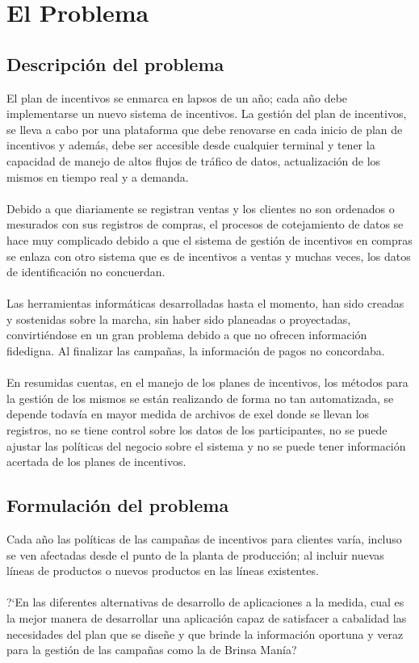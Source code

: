 \chapter{El Problema}\label{Problema}
\section{Descripci\'on del problema}
El plan de incentivos se enmarca en lapsos de un a\~no; cada a\~no debe implementarse un nuevo sistema de incentivos. La gesti\'on del plan de incentivos, se lleva a cabo por una plataforma que debe renovarse en cada inicio de plan de incentivos y adem\'as, debe ser accesible desde cualquier terminal y tener la capacidad de manejo de altos flujos de tr\'afico de datos, actualizaci\'on de los mismos en tiempo real y a demanda.%
\\%
\\%
Debido a que diariamente se registran ventas y los clientes no son ordenados o mesurados con sus registros de compras, el procesos de cotejamiento de datos se hace muy complicado debido a que el sistema de gesti\'on de incentivos en compras se enlaza con otro sistema que es de incentivos a ventas y muchas veces, los datos de identificaci\'on no concuerdan.%
\\%
\\%
Las herramientas inform\'aticas desarrolladas hasta el momento, han sido creadas y sostenidas sobre la marcha, sin haber sido planeadas o proyectadas, convirti\'endose en un gran problema debido a que no ofrecen informaci\'on fidedigna. Al finalizar las campa\~nas, la informaci\'on de pagos no concordaba.%
\\%
\\%
En resumidas cuentas, en el manejo de los planes de incentivos, los m\'etodos para la gesti\'on de los mismos se est\'an realizando de forma no tan automatizada, se depende todav\'ia en mayor medida de archivos de exel donde se llevan los registros, no se tiene control sobre los datos de los participantes, no se puede ajustar las pol\'iticas del negocio sobre el sistema y no se puede tener informaci\'on acertada de los planes de incentivos.%
%
\section{Formulaci\'on del problema}
Cada a\~no las pol\'iticas de las campa\~nas de incentivos para clientes var\'ia, incluso se ven afectadas desde el punto de la planta de producci\'on; al incluir nuevas l\'ineas de productos o nuevos productos en las l\'ineas existentes.%
\\%
\\%
?`En las diferentes alternativas de desarrollo de aplicaciones a la medida, cual es la mejor manera de desarrollar una aplicaci\'on capaz de satisfacer a cabalidad las necesidades del plan que se dise\~ne y que brinde la informaci\'on oportuna y veraz para la gesti\'on de las campa\~nas como la de Brinsa Man\'ia?%
%
